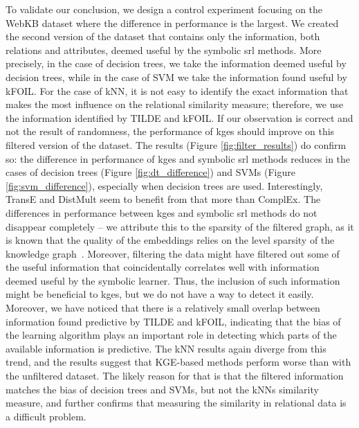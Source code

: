 To validate our conclusion, we design a control experiment focusing on the WebKB dataset where the difference in performance is the largest.
We created the second version of the dataset that contains only the information, both relations and attributes, deemed useful by the symbolic \gls{srl} methods.
More precisely, in the case of decision trees, we take the information deemed useful by decision trees, while in the case of SVM we take the information found useful by kFOIL.
For the case of kNN, it is not easy to identify the exact information that makes the most influence on the relational similarity measure; therefore, we use the information identified by TILDE and kFOIL.
If our observation is correct and not the result of randomness, the performance of \gls{kge}s should improve on this filtered version of the dataset.
The results (Figure \ref{fig:filter_results}) do confirm so: the difference in performance of \gls{kge}s and symbolic \gls{srl} methods reduces in the cases of decision trees (Figure \ref{fig:dt_difference}) and SVMs (Figure \ref{fig:svm_difference}), especially when decision trees are used.
Interestingly, TransE and DistMult seem to benefit from that more than ComplEx.
The differences in performance between \gls{kge}s and symbolic \gls{srl} methods do not disappear completely -- we attribute this to the sparsity of the filtered graph, as it is known that the quality of the embeddings relies on the level sparsity of the knowledge graph~\cite{pujara:emnlp17}.
Moreover, filtering the data might have filtered out some of the useful information that coincidentally correlates well with information deemed useful by the symbolic learner.
Thus, the inclusion of such information might be beneficial to \gls{kge}s, but we do not have a way to detect it easily.
Moreover, we have noticed that there is a relatively small overlap between information found predictive by TILDE and kFOIL, indicating that the bias of the learning algorithm plays an important role in detecting which parts of the available information is predictive.
The kNN results again diverge from this trend, and the results suggest that KGE-based methods perform worse than with the unfiltered dataset.
The likely reason for that is that the filtered information matches the bias of decision trees and SVMs, but not the kNNs similarity measure, and further confirms that measuring the similarity in relational data is a difficult problem.




